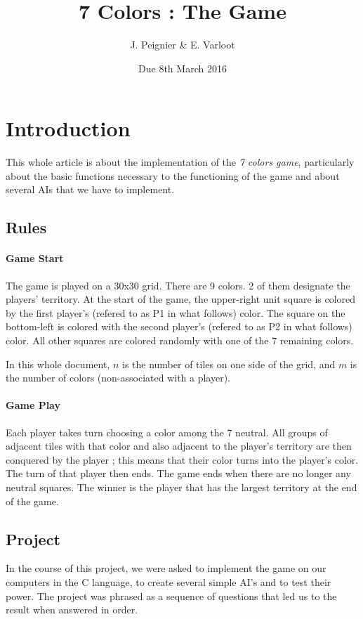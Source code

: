 \documentclass[a4paper]{article}
\title{7 Colors : The Game}
\author{J. Peignier \& E. Varloot}
\date{Due 8th March 2016}
\begin{document}
\maketitle

\tableofcontents

\pagebreak
	
\section{Introduction}

This whole article is about the implementation of the \textit{7 colors game}, particularly about the basic functions necessary to the functioning of the game and about several AIs that we have to implement.

\subsection{Rules}

\paragraph{Game Start} The game is played on a 30x30 grid. There are 9 colors. 2 of them designate the players' territory. At the start of the game, the upper-right unit square is colored by the first player's (refered to as P1 in what follows) color.
The square on the bottom-left is colored with the second player's (refered to as P2 in what follows) color. All other squares are colored randomly with one of the 7 remaining colors.

In this whole document, $n$ is the number of tiles on one side of the grid, and $m$ is the number of colors (non-associated with a player).

\paragraph{Game Play} Each player takes turn choosing a color among the 7 neutral. All groups of adjacent tiles with that color and also adjacent to the player's territory are then conquered by the player ; this means that their color turns into the player's color.
The turn of that player then ends.
The game ends when there are no longer any neutral squares.
The winner is the player that has the largest territory at the end of the game.

\subsection{Project}
In the course of this project, we were asked to implement the game on our computers in the C language, to create several simple AI's and to test their power.
The project was phrased as a sequence of questions that led us to the result when answered in order.
\bigskip
\end{document}
